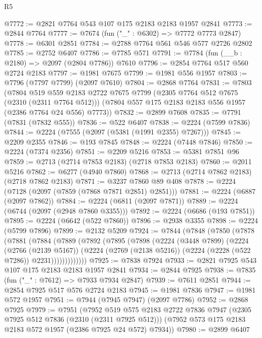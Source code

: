\begin{lexlean}{R5}
\begin{coremodule}
@7772 := @2821 @7764 @543 @107 @175 @2183 @2183 @1957 @2841
@7773 := @2844 @7764
@7777 := @7674 (fun ("_" : @6302) => @7772 @7773 @2847)
@7778 := @6301 @2851
@7784 := @2788 @7764 @561 @546 @577 @2726 @2802
@7785 := @2752 @6407
@7786 := @7785 @571
@7791 := @7784 (fun (__b : @2180) => @2097 (@2804 @7786)) @7610
@7796 := @2854 @7764 @517 @560 @2724 @2183
@7797 := @1981 @7675
@7799 := @1981 @556 @1957
@7803 := @7796 (@7797 @7799) (@2097 @7610)
@7804 := @2868 @7764
@7831 := @7803
    (@7804
      @519
      @559
      @2183
      @2722
      @7675
      @7799
      (@2305 @7764 @512 @7675 (@2310 (@2311 @7764 @512)))
      (@7804 @557 @175 @2183 @2183 @556 @1957 (@2386 @7764 @24 @556) @7773))
@7832 := @2899 @7608
@7835 := @7791 (@7831 (@7832 @555))
@7836 := @522 @6407
@7838 := @2224 (@7599 @7836)
@7844 := @2224 (@7555 (@2097 (@5381 (@1991 @2355) @7267)))
@7845 := @2209 @2355
@7846 := @193 @7845
@7848 := @2224 (@7448 @7846)
@7850 := @2224 (@7374 @2356)
@7851 := @2209 @5216
@7853 := @5381 @7851 @96
@7859 := @2713 (@2714 @7853 @2183) (@2718 @7853 @2183)
@7860 := @2011 @5216
@7862 := @6277 (@4940 @7860)
@7868 := @2713 (@2714 @7862 @2183) (@2718 @7862 @2183)
@7871 := @3237 @7860 @89 @408
@7878 := @2224 (@7128 (@2097 (@7859 (@7868 @7871 @2851) @2851)))
@7881 := @2224 (@6887 (@2097 @7862))
@7884 := @2224 (@6811 (@2097 @7871))
@7889 := @2224 (@6744 (@2097 (@2948 @7860 @3355)))
@7892 := @2224 (@6686 (@193 @7851))
@7895 := @2224 (@6642 (@522 @7860))
@7896 := @2938 @3355
@7898 := @2224 (@5799 @7896)
@7899 := @2132 @5209
@7924 := @7844
    (@7848
      (@7850
        (@7878
          (@7881
            (@7884
              (@7889
                (@7892
                  (@7895
                    (@7898
                      (@2224
                        (@3448 @7899)
                        (@2224
                          (@2766 (@2139 @5167))
                          (@2224
                            (@2769 (@2138 @5216))
                            (@2224 (@2228 (@522 @7286)) @2231)))))))))))))
@7925 := @7838 @7924
@7933 := @2821 @7925 @543 @107 @175 @2183 @2183 @1957 @2841
@7934 := @2844 @7925
@7938 := @7835 (fun ("_" : @7612) => @7933 @7934 @2847)
@7939 := @7611 @2851
@7944 := @2854 @7925 @517 @576 @2724 @2183
@7945 := @1981 @7836
@7947 := @1981 @572 @1957
@7951 := @7944 (@7945 @7947) (@2097 @7786)
@7952 := @2868 @7925
@7979 := @7951
    (@7952
      @519
      @575
      @2183
      @2722
      @7836
      @7947
      (@2305 @7925 @512 @7836 (@2310 (@2311 @7925 @512)))
      (@7952 @573 @175 @2183 @2183 @572 @1957 (@2386 @7925 @24 @572) @7934))
@7980 := @2899 @6407

\end{coremodule}
\end{lexlean}
